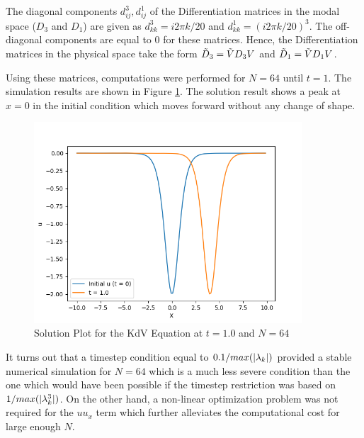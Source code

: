\documentclass[12pt]{article}
\DeclarePairedDelimiter\abs{\lvert}{\rvert}
\begin{document}
The diagonal components $d^3_{ij}, d^1_{ij}$ of the Differentiation matrices in the modal space ($D_3$ and $D_1$) are given as $d^3_{kk} = i 2 \pi k /20$ and $d^1_{kk} = (i 2 \pi k /20)^3$. The off-diagonal components are equal to $0$ for these matrices. Hence, the Differentiation matrices in the physical space take the form $\Tilde{D}_3 = \Tilde{V} D_3 V$ and $\Tilde{D}_1 = \Tilde{V} D_1 V$.

Using these matrices, computations were performed for $N = 64$ until $t = 1$. The simulation results are shown in Figure \ref{fig:Q2_N=64,t=1}. The solution result shows a peak at $x = 0$ in the initial condition which moves forward without any change of shape. 
\begin{figure}
    \centering
    \includegraphics[width = 10cm]{solutionPlot_N=64t = 1.0.png}
    \caption{Solution Plot for the KdV Equation at $t = 1.0$ and $N = 64$}
    \label{fig:Q2_N=64,t=1}
\end{figure}
It turns out that a timestep condition equal to $0.1/max(\abs{\lambda_k})$ provided a stable numerical simulation for $N = 64$ which is a much less severe condition than the one which would have been possible if the timestep restriction was based on $1/max(\abs{\lambda_k^3})$. On the other hand, a non-linear optimization problem was not required for the $uu_x$ term which further alleviates the computational cost for large enough $N$.
\end{document}
